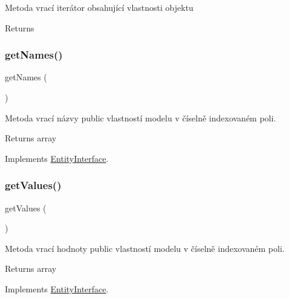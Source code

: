 Metoda vrací iterátor obsahující vlastnosti objektu \begin{DoxyReturn}{Returns}

\end{DoxyReturn}
\mbox{\label{class_pes_1_1_entity_1_1_entity_abstract_a64e8191090bf560e825966b082e868f0}} 
\subsubsection{\texorpdfstring{get\+Names()}{getNames()}}
{\footnotesize\ttfamily get\+Names (\begin{DoxyParamCaption}{ }\end{DoxyParamCaption})}

Metoda vrací názvy public vlastností modelu v číselně indexovaném poli. \begin{DoxyReturn}{Returns}
array 
\end{DoxyReturn}


Implements \mbox{\hyperlink{interface_pes_1_1_entity_1_1_entity_interface}{Entity\+Interface}}.

\mbox{\label{class_pes_1_1_entity_1_1_entity_abstract_a70a0fe08035189260c72e32a9e20d30c}} 
\subsubsection{\texorpdfstring{get\+Values()}{getValues()}}
{\footnotesize\ttfamily get\+Values (\begin{DoxyParamCaption}{ }\end{DoxyParamCaption})}

Metoda vrací hodnoty public vlastností modelu v číselně indexovaném poli. \begin{DoxyReturn}{Returns}
array 
\end{DoxyReturn}


Implements \mbox{\hyperlink{interface_pes_1_1_entity_1_1_entity_interface}{Entity\+Interface}}.

